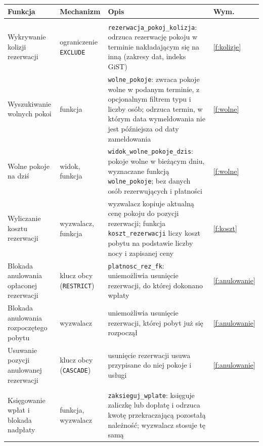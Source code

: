 \documentclass[12pt,a4paper]{article}
\newcommand{\us}{\_\allowbreak}
\begin{document}
\begin{longtable}{>{\raggedright\arraybackslash}p{4.5cm}
                  >{\raggedright\arraybackslash}p{3cm}
                  >{\raggedright\arraybackslash}p{5.5cm}
                  p{1.5cm}}
\toprule
\textbf{Funkcja} & \textbf{Mechanizm} & \textbf{Opis} & \textbf{Wym.} \\
\midrule
\endhead

\multicolumn{4}{l}{\textit{Wersja podstawowa -- rezerwacje}} \\
\midrule
Wykrywanie kolizji rezerwacji & ograniczenie \texttt{EXCLUDE}
  & \texttt{rezerwacja\us pokoj\us kolizja}: odrzuca rezerwację pokoju
    w terminie nakładającym się na inną (zakresy dat, indeks GiST)
  & \ref{f:kolizje} \\
Wyszukiwanie wolnych pokoi & funkcja
  & \texttt{wolne\us pokoje}: zwraca pokoje wolne w podanym terminie,
    z opcjonalnym filtrem typu i liczby osób; odrzuca termin, w którym
    data wymeldowania nie jest późniejsza od daty zameldowania
  & \ref{f:wolne} \\
Wolne pokoje na dziś & widok, funkcja
  & \texttt{widok\us wolne\us pokoje\us dzis}: pokoje wolne w bieżącym
    dniu, wyznaczane funkcją \texttt{wolne\us pokoje}; bez danych osób
    rezerwujących i płatności
  & \ref{f:wolne} \\
Wyliczanie kosztu rezerwacji & wyzwalacz, funkcja
  & wyzwalacz kopiuje aktualną cenę pokoju do pozycji rezerwacji;
    funkcja \texttt{koszt\us rezerwacji} liczy koszt pobytu na podstawie
    liczby nocy i zapisanej ceny
  & \ref{f:koszt} \\
Blokada anulowania opłaconej rezerwacji & klucz obcy (\texttt{RESTRICT})
  & \texttt{platnosc\us rez\us fk}: uniemożliwia usunięcie rezerwacji,
    do której dokonano wpłaty
  & \ref{f:anulowanie} \\
Blokada anulowania rozpoczętego pobytu & wyzwalacz
  & uniemożliwia usunięcie rezerwacji, której pobyt już się rozpoczął
  & \ref{f:anulowanie} \\
Usuwanie pozycji anulowanej rezerwacji & klucz obcy (\texttt{CASCADE})
  & usunięcie rezerwacji usuwa przypisane do niej pokoje i usługi
  & \ref{f:anulowanie} \\
\midrule
\multicolumn{4}{l}{\textit{Wersja podstawowa -- płatności}} \\
\midrule
Księgowanie wpłat i blokada nadpłaty & funkcja, wyzwalacz
  & \texttt{zaksieguj\us wplate}: księguje zaliczkę lub dopłatę i odrzuca
    kwotę przekraczającą pozostałą należność; wyzwalacz stosuje tę samą

\end{longtable}
\end{document}
